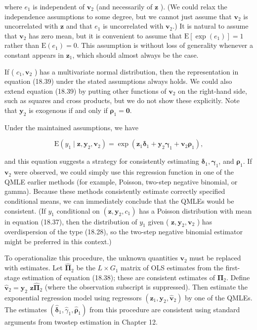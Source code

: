 \documentclass[10pt]{article}
\begin{document}
where $e_{1}$ is independent of $\mathbf{v}_{2}$ (and necessarily of $\mathbf{z}$ ). (We could relax the independence assumptions to some degree, but we cannot just assume that $\mathbf{v}_{2}$ is uncorrelated with $\mathbf{z}$ and that $e_{1}$ is uncorrelated with $\mathbf{v}_{2}$.) It is natural to assume that $\mathbf{v}_{2}$ has zero mean, but it is convenient to assume that $\mathrm{E}\left[\exp \left(e_{1}\right)\right]=1$ rather than $\mathrm{E}\left(e_{1}\right)=0$. This assumption is without loss of generality whenever a constant appears in $\mathbf{z}_{1}$, which should almost always be the case.

If ( $c_{1}, \mathbf{v}_{2}$ ) has a multivariate normal distribution, then the representation in equation (18.39) under the stated assumptions always holds. We could also extend equation (18.39) by putting other functions of $\mathbf{v}_{2}$ on the right-hand side, such as squares and cross products, but we do not show these explicitly. Note that $\mathbf{y}_{2}$ is exogenous if and only if $\boldsymbol{\rho}_{1}=\mathbf{0}$.

Under the maintained assumptions, we have


\begin{equation*}
\mathrm{E}\left(y_{1} \mid \mathbf{z}, \mathbf{y}_{2}, \mathbf{v}_{2}\right)=\exp \left(\mathbf{z}_{1} \boldsymbol{\delta}_{1}+\mathbf{y}_{2} \boldsymbol{\gamma}_{1}+\mathbf{v}_{2} \boldsymbol{\rho}_{1}\right), \tag{18.40}
\end{equation*}


and this equation suggests a strategy for consistently estimating $\boldsymbol{\delta}_{1}, \boldsymbol{\gamma}_{1}$, and $\boldsymbol{\rho}_{1}$. If $\mathbf{v}_{2}$ were observed, we could simply use this regression function in one of the QMLE earlier methods (for example, Poisson, two-step negative binomial, or gamma). Because these methods consistently estimate correctly specified conditional means, we can immediately conclude that the QMLEs would be consistent. (If $y_{1}$ conditional on $\left(\mathbf{z}, \mathbf{y}_{2}, c_{1}\right)$ has a Poisson distribution with mean in equation (18.37), then the distribution of $y_{1}$ given ( $\mathbf{z}, \mathbf{y}_{2}, \mathbf{v}_{2}$ ) has overdispersion of the type (18.28), so the two-step negative binomial estimator might be preferred in this context.)

To operationalize this procedure, the unknown quantities $\mathbf{v}_{2}$ must be replaced with estimates. Let $\hat{\boldsymbol{\Pi}}_{2}$ be the $L \times G_{1}$ matrix of OLS estimates from the first-stage estimation of equation (18.38); these are consistent estimates of $\boldsymbol{\Pi}_{2}$. Define $\hat{\mathbf{v}}_{2}=\mathbf{y}_{2}$ $\mathbf{z} \hat{\boldsymbol{\Pi}}_{2}$ (where the observation subscript is suppressed). Then estimate the exponential regression model using regressors $\left(\mathbf{z}_{1}, \mathbf{y}_{2}, \hat{\mathbf{v}}_{2}\right)$ by one of the QMLEs. The estimates $\left(\hat{\boldsymbol{\delta}}_{1}, \hat{\gamma}_{1}, \hat{\boldsymbol{\rho}}_{1}\right)$ from this procedure are consistent using standard arguments from twostep estimation in Chapter 12.
\end{document}
